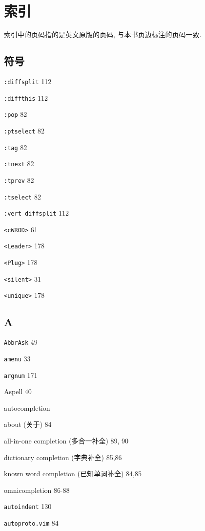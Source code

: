 \chapter{索引}
\label{chap:index}

索引中的页码指的是英文原版的页码, 与本书页边标注的页码一致.

\begin{multicols}{2}

\section*{符号}

\texttt{:diffsplit} 112

\texttt{:diffthis} 112

\texttt{:pop} 82

\texttt{:ptselect} 82

\texttt{:tag} 82

\texttt{:tnext} 82

\texttt{:tprev} 82

\texttt{:tselect} 82

\texttt{:vert diffsplit} 112

\texttt{<cWROD>} 61

\texttt{<Leader>} 178

\texttt{<Plug>} 178

\texttt{<silent>} 31

\texttt{<unique>} 178

\section*{A}

\texttt{AbbrAsk} 49

\texttt{amenu} 33

\texttt{argnum} 171

Aspell 40

autocompletion \par
  about (关于) 84 \par
  all-in-one completion (多合一补全) 89, 90 \par
  dictionary completion (字典补全) 85,86 \par
  known word completion (已知单词补全) 84,85 \par
  omnicompletion 86-88 \par

\texttt{autoindent} 130

\texttt{autoproto.vim} 84


\end{multicols}
